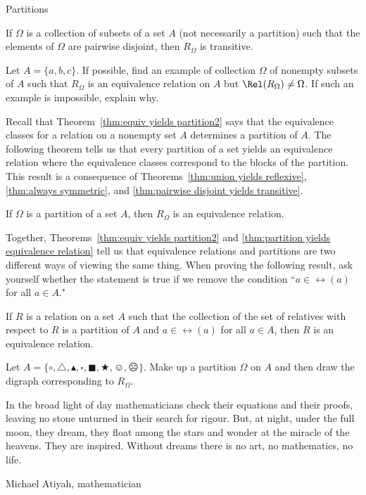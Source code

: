 \begin{section}{Partitions}
\begin{theorem}\label{thm:pairwise disjoint yields transitive}
If $\Omega$ is a collection of subsets of a set $A$ (not necessarily a partition) such that the elements of $\Omega$ are pairwise disjoint, then $R_{\Omega}$ is transitive.
\end{theorem}

\begin{problem}
Let $A=\{a,b,c\}$. If possible, find an example of collection $\Omega$ of nonempty subsets of $A$ such that $R_{\Omega}$ is an equivalence relation on $A$ but $\Rel(R_{\Omega})\neq \Omega$.  If such an example is impossible, explain why. 
\end{problem}

Recall that Theorem~\ref{thm:equiv yields partition2} says that the equivalence classes for a relation on a nonempty set $A$ determines a partition of $A$.  The following theorem tells us that every partition of a set yields an equivalence relation where the equivalence classes correspond to the blocks of the partition. This result is a consequence of Theorems~\ref{thm:union yields reflexive}, \ref{thm:always symmetric}, and \ref{thm:pairwise disjoint yields transitive}.

\begin{theorem}\label{thm:partition yields equivalence relation}
If $\Omega$ is a partition of a set $A$, then $R_{\Omega}$ is an equivalence relation.
\end{theorem}

Together, Theorems~\ref{thm:equiv yields partition2} and \ref{thm:partition yields equivalence relation} tell us that equivalence relations and partitions are two different ways of viewing the same thing. When proving the following result, ask yourself whether the statement is true if we remove the condition ``$a\in\rel(a)$ for all $a\in A$."

\begin{theorem}\label{thm:partition yields equivalence relation}
If $R$ is a relation on a set $A$ such that the collection of the set of relatives with respect to $R$ is a partition of $A$ and $a\in\rel(a)$ for all $a\in A$, then $R$ is an equivalence relation.
\end{theorem}

\begin{problem}
Let $A=\{\circ, \triangle, \blacktriangle, \square, \blacksquare, \bigstar, \smiley, \frownie\}$.  Make up a partition $\Omega$ on $A$ and then draw the digraph corresponding to $R_{\Omega}$. 
\end{problem}

\epigraph{In the broad light of day mathematicians check their equations and their proofs, leaving no stone unturned in their search for rigour. But, at night, under the full moon, they dream, they float among the stars and wonder at the miracle of the heavens. They are inspired. Without dreams there is no art, no mathematics, no life.}{Michael Atiyah, mathematician}

\end{section}